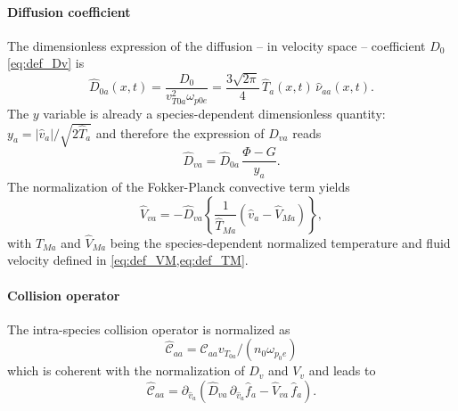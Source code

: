 \documentclass[11pt]{article}
\begin{document}
\paragraph{Diffusion coefficient}
\label{par:diffusion_coefficient}
The dimensionless expression of the diffusion -- in velocity space -- coefficient $D_0$ \cref{eq:def_Dv} is
%
\begin{equation}
	\hat D_{0a}(x,t) = \frac{D_0}{v_{T0a}^2 \omega_{p0e}}
	= \frac{3\sqrt{2\pi}}{4}\, \hat T_a(x,t) \, \hat \nu_{aa}(x,t).
\end{equation}
%
The $y$ variable is already a species-dependent dimensionless quantity: $y_a = \left| \hat{v}_a \right| /\sqrt{2 \hat{T}_a} $ and therefore the expression of $\hat{D}_{va}$ reads
%
\begin{equation}\label{eq:Dva}
  \hat{D}_{va} = \hat{D}_{0a}\, \dfrac{\Phi - G}{y_a}.
\end{equation}
%
The normalization of the Fokker-Planck convective term yields
%
\begin{equation}\label{eq:nr_vv}
  \hat{V}_{va} = - \hat{D}_{va} \left\{ \dfrac{1}{\hat{T}_{Ma}} \left( \hat{v}_a - \hat{V}_{Ma} \right)  \right\} ,
\end{equation}
%
with $\hat{T}_{Ma}$ and $\hat{V}_{Ma}$ being the species-dependent normalized temperature and fluid velocity defined in \cref{eq:def_VM,eq:def_TM}. 

\paragraph{Collision operator}
\label{par:collision_operator}
The intra-species collision operator is normalized as 
%
\begin{equation}\label{eq:nm_caa}
  \hat{\mathcal{C}}_{aa} = \mathcal{C}_{aa} v_{T_{0a}}/(n_0 \omega_{p_0e})
\end{equation}
%
which is coherent with the normalization of $D_v$ and $V_v$ and leads to
%
\begin{equation}\label{eq:c_aa_nr}
  \hat{\mathcal{C}}_{aa} = \partial_{\hat{v}_a} \left( \hat{D}_{va}\,  \partial_{\hat{v}_a}\hat{f}_a - \hat{V}_{va}\, \hat{f}_a \right) .
\end{equation}
%
\end{document}

